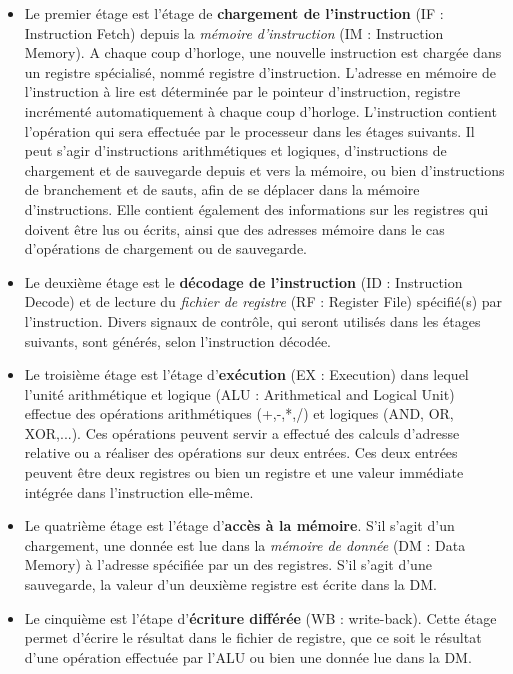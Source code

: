 \begin{itemize}
  \item Le premier étage est l'étage de \textbf{chargement de l'instruction} (IF : Instruction Fetch) depuis la \textit{mémoire d'instruction} (IM : Instruction Memory). A chaque coup d'horloge, une nouvelle instruction est chargée dans un registre spécialisé, nommé registre d'instruction. L'adresse en mémoire de l'instruction à lire est déterminée par le pointeur d'instruction, registre incrémenté automatiquement à chaque coup d'horloge. L'instruction contient l'opération qui sera effectuée par le processeur dans les étages suivants. Il peut s'agir d'instructions arithmétiques et logiques, d'instructions de chargement et de sauvegarde depuis et vers la mémoire, ou bien d'instructions de branchement et de sauts, afin de se déplacer dans la mémoire d'instructions. Elle contient également des informations sur les registres qui doivent être lus ou écrits, ainsi que des adresses mémoire dans le cas d'opérations de chargement ou de sauvegarde.

  \item Le deuxième étage est le \textbf{décodage de l'instruction} (ID : Instruction Decode) et de lecture du \textit{fichier de registre} (RF : Register File) spécifié(s) par l'instruction. Divers signaux de contrôle, qui seront utilisés dans les étages suivants, sont générés, selon l'instruction décodée.

  \item Le troisième étage est l'étage d'\textbf{exécution} (EX : Execution) dans lequel l'unité arithmétique et logique (ALU : Arithmetical and Logical Unit) effectue des opérations arithmétiques (+,-,*,/) et logiques (AND, OR, XOR,...). Ces opérations peuvent servir a effectué des calculs d'adresse relative ou a réaliser des opérations sur deux entrées. Ces deux entrées peuvent être deux registres ou bien un registre et une valeur immédiate intégrée dans l'instruction elle-même.

  \item Le quatrième étage est l'étage d'\textbf{accès à la mémoire}. S'il s'agit d'un chargement, une donnée est lue dans la \textit{mémoire de donnée} (DM : Data Memory) à l'adresse spécifiée par un des registres. S'il s'agit d'une sauvegarde, la valeur d'un deuxième registre est écrite dans la DM.

  \item Le cinquième est l'étape d'\textbf{écriture différée} (WB : write-back). Cette étage permet d'écrire le résultat dans le fichier de registre, que ce soit le résultat d'une opération effectuée par l'ALU ou bien une donnée lue dans la DM.
\end{itemize}

